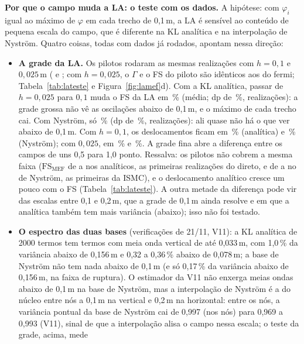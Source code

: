 \documentclass[11pt,a4paper]{article}
\begin{document}
\textbf{Por que o campo muda a LA: o teste com os dados.} A hipótese: com $\varphi_i$ igual ao máximo de $\varphi$ em
cada trecho de 0,1\,m, a LA é sensível ao conteúdo de pequena escala do campo, que é diferente na KL analítica e na
interpolação de Nyström. Quatro coisas, todas com dados já rodados, apontam nessa direção:
\begin{itemize}
  \item \textbf{A grade da LA.} Os pilotos rodaram as mesmas realizações com $h = 0{,}1$ e $0{,}025$\,m
    ( e ; com $h = 0{,}025$, o $\Gamma$ e o FS
    do piloto são idênticos aos do fermi; Tabela~\ref{tab:lateste} e Figura~\ref{fig:lamef}d). Com a KL analítica,
    passar de $h = 0{,}025$ para $0{,}1$ muda
    o FS da LA em \lmGradeAn\,\% (média; dp de \lmGradeAnDp\,\%, \lmGradeAnN{} realizações): a grade grossa não vê as
    oscilações abaixo de 0,1\,m, e o máximo de cada trecho cai. Com Nyström, só \lmGradeNy\,\% (dp de
    \lmGradeNyDp\,\%, \lmGradeNyN{} realizações): ali quase não há o que ver abaixo de 0,1\,m. Com
    $h = 0{,}1$, os deslocamentos ficam em \lmGradeAnUm\,\% (analítica) e \lmGradeNyUm\,\% (Nyström); com $0{,}025$, em
    \lmGradeAnDois\,\% e \lmGradeNyDois\,\%. A grade fina abre a diferença entre os campos de uns 0,5 para 1,0 ponto.
    Ressalva: os pilotos não cobrem a mesma faixa ($\mathrm{FS}_\text{MEF}$ de \lmGradeAnFsMin{} a \lmGradeAnFsMax{} nos
    analíticos, as primeiras realizações do direto, e de \lmGradeNyFsMin{} a \lmGradeNyFsMax{} no de Nyström, as
    primeiras da ISMC), e o deslocamento analítico cresce um pouco com o FS (Tabela~\ref{tab:lateste}). A outra metade da
    diferença pode vir das escalas entre 0,1 e 0,2\,m, que a grade de 0,1\,m ainda resolve e em que a analítica também
    tem mais variância (abaixo); isso não foi testado.
  \item \textbf{O espectro das duas bases} (verificações de 21/11, V11): a KL analítica de 2000 termos tem termos com
      meia onda vertical de até
    0,033\,m, com 1,0\,\% da variância abaixo de 0,156\,m e 0,32 a 0,36\,\% abaixo de 0,078\,m; a base de Nyström não
    tem nada abaixo de 0,1\,m (e só 0,17\,\% da variância abaixo de 0,156\,m, na faixa de ruptura). O estimador da V11
    não enxerga meias ondas abaixo de 0,1\,m na base de Nyström, mas a interpolação de Nyström é a do núcleo entre nós a
    0,1\,m na vertical e 0,2\,m na horizontal: entre os nós, a variância pontual da base de Nyström cai de 0,997 (nos
    nós) para 0,969 a 0,993 (V11), sinal de que a interpolação alisa o campo nessa escala; o teste da grade, acima, mede

\end{itemize}
\end{document}
